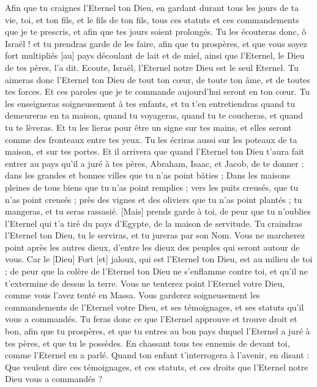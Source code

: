 \begin{multicols}{2}
Afin que tu craignes l'Eternel ton Dieu, en gardant durant tous les jours de ta vie, toi, et ton fils, et le fils de ton fils, tous ces statuts et ces commandements que je te prescris, et afin que tes jours soient prolongés.
Tu les écouteras donc, ô Israël ! et tu prendras garde de les faire, afin que tu prospères, et que vous soyez fort multipliés [au] pays découlant de lait et de miel, ainsi que l'Eternel, le Dieu de tes pères, l'a dit.
Ecoute, Israël, l'Eternel notre Dieu est le seul Eternel.
Tu aimeras donc l'Eternel ton Dieu de tout ton cœur, de toute ton âme, et de toutes tes forces.
Et ces paroles que je te commande aujourd'hui seront en ton cœur.
Tu les enseigneras soigneusement à tes enfants, et tu t'en entretiendras quand tu demeureras en ta maison, quand tu voyageras, quand tu te coucheras, et quand tu te lèveras.
Et tu les lieras pour être un signe sur tes mains, et elles seront comme des fronteaux entre tes yeux.
Tu les écriras aussi sur les poteaux de ta maison, et sur tes portes.
Et il arrivera que quand l'Eternel ton Dieu t'aura fait entrer au pays qu'il a juré à tes pères, Abraham, Isaac, et Jacob, de te donner ; dans les grandes et bonnes villes que tu n'as point bâties ;
Dans les maisons pleines de tous biens que tu n'as point remplies ; vers les puits creusés, que tu n'as point creusés ; près des vignes et des oliviers que tu n'as point plantés ; tu mangeras, et tu seras rassasié.
[Mais] prends garde à toi, de peur que tu n'oublies l'Eternel qui t'a tiré du pays d'Egypte, de la maison de servitude.
Tu craindras l'Eternel ton Dieu, tu le serviras, et tu jureras par son Nom.
Vous ne marcherez point après les autres dieux, d'entre les dieux des peuples qui seront autour de vous.
Car le [Dieu] Fort [et] jaloux, qui est l'Eternel ton Dieu, est au milieu de toi ; de peur que la colère de l'Eternel ton Dieu ne s'enflamme contre toi, et qu'il ne t'extermine de dessus la terre.
Vous ne tenterez point l'Eternel votre Dieu, comme vous l'avez tenté en Massa.
Vous garderez soigneusement les commandements de l'Eternel votre Dieu, et ses témoignages, et ses statuts qu'il vous a commandés.
Tu feras donc ce que l'Eternel approuve et trouve droit et bon, afin que tu prospères, et que tu entres au bon pays duquel l'Eternel a juré à tes pères, et que tu le possèdes.
En chassant tous tes ennemis de devant toi, comme l'Eternel en a parlé.
Quand ton enfant t'interrogera à l'avenir, en disant : Que veulent dire ces témoignages, et ces statuts, et ces droits que l'Eternel notre Dieu vous a commandés ?

\end{multicols}
